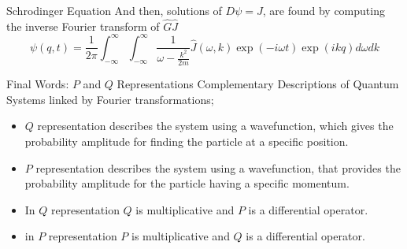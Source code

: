 \documentclass[12pt]{beamer}
\begin{document}
\begin{frame}{Schrodinger Equation}
And then, solutions of $D\psi=J$, are found by computing the inverse Fourier transform of $\hat G\hat J$
\begin{displaymath}
  \psi(q,t) = \frac{1}{2\pi}\int_{-\infty}^{\infty}\int_{-\infty}^{\infty}\frac{1}{\omega -\frac{k^2}{2m}}\hat J(\omega, k)\exp(-i\omega t)\exp(ikq)d\omega dk
\end{displaymath}
\end{frame}
\begin{frame}{Final Words: $P$ and $Q$ Representations}
Complementary Descriptions of Quantum Systems linked by Fourier transformations;
\begin{itemize}
	\item $Q$ representation describes the system using a wavefunction, which gives the probability amplitude for finding the particle at a specific position.
	\item $P$ representation describes the system using a wavefunction, that provides the probability amplitude for the particle having a specific momentum.
	\item In $Q$ representation $Q$ is multiplicative and $P$ is a differential operator.
	\item in $P$ representation $P$ is multiplicative and $Q$ is a differential operator.
\end{itemize}
\end{frame}
\end{document}
